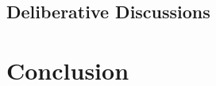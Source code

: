 \documentclass[journal,10pt]{IEEEtran}
\begin{document}
\subsection{Deliberative Discussions}

\section{Conclusion}




\appendices

\label{Chart}
\clearpage

\label{Easy}

\label{Hard}
\end{document}
